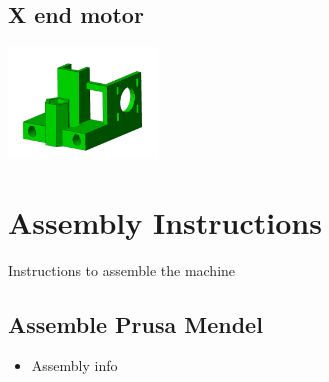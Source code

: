 \documentclass[11pt]{article}
\begin{document}
\subsection{X end motor}


\includegraphics[width=4cm]{images/x-end-motor.jpg}
\newpage
\section{Assembly Instructions}
Instructions to assemble the machine
\subsection{Assemble Prusa Mendel}
\begin{itemize}
\item Assembly info
\end{itemize}
\end{document}
